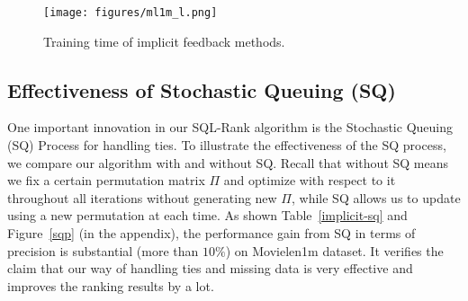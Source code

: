 \documentclass{article}
\begin{document}
 \begin{figure}[ht]
\vskip -0.1in
\begin{center}
\centerline{\texttt{[image: figures/ml1m\_l.png]}}
\caption{Training time of implicit feedback methods.}
\label{time}
\end{center}
\vskip -0.4in
\end{figure}

\subsection{Effectiveness of Stochastic Queuing (SQ)}

One important innovation in our SQL-Rank algorithm is the Stochastic Queuing (SQ) Process for handling ties. 
To illustrate the effectiveness of the SQ process, we compare our algorithm with and without SQ. Recall that without SQ means we fix a certain permutation matrix $\Pi$ and optimize with respect to it throughout all iterations without generating new $\Pi$, while SQ allows us to update using a new permutation at each time. As shown 
Table~\ref{implicit-sq} and Figure~\ref{sqp} (in the appendix),
the performance gain from SQ in terms of precision is substantial (more than $10\%$) on Movielen1m dataset. It verifies the claim that our way of handling ties and missing data is very effective and improves the ranking results by a lot. 

\begin{table}[t]
\caption{Effectiveness of Stochastic Queuing Process.}
\label{implicit-sq}
\vskip 0.15in
\begin{center}
\begin{small}
\begin{sc}
\end{sc}
\end{small}
\end{center}
\vskip -0.2in
\end{table}
\end{document}
